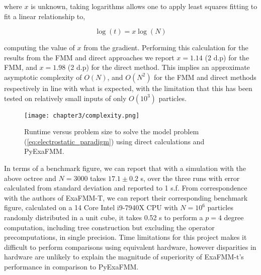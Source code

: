 where $x$ is unknown, taking logarithms allows one to apply least squares fitting
to fit a linear relationship to,

\begin{equation}
    \log(t) = x \log(N)
\end{equation}

computing the value of $x$ from the gradient. Performing this calculation for the
results from the \gls{FMM} and direct approaches we report $x=1.14$ (2 d.p) for
the FMM, and $x=1.98$ (2 d.p) for the direct method. This implies an approximate
asymptotic complexity of $O(N)$, and $O(N^2)$ for the \gls{FMM} and direct methods
respectively in line with what is expected, with the limitation that this has
been tested on relatively small inputs of only $O(10^3)$ particles.

\begin{figure}[ht]
    \centering

  {\texttt{[image: chapter3/complexity.png]}}
  \vspace{0pt}
    \caption{
        Runtime versus problem size to solve the model problem
        (\ref{eq:electrostatic_paradigm}) using direct calculations and
        \gls{PyExaFMM}.
    }
    \label{fig:3_1_complexity}
\end{figure}

In terms of a benchmark figure, we can report that with a simulation with
the above octree and $N=3000$ takes $17.1 \pm 0.2$ s, over the three runs with
error calculated from standard deviation and reported to 1 s.f. From correspondence
with the authors of ExaFMM-T, we can report their corresponding benchmark figure,
calculated on a 14 Core Intel i9-7940X \gls{CPU} with $N=10^6$ particles
randomly distributed in a unit cube, it takes 0.52 s to perform a $p=4$ degree
computation, including tree construction but excluding the
operator precomputations, in single precision. Time limitations for this project
makes it difficult to perform comparisons using equivalent hardware, however
disparities in hardware are unlikely to explain the magnitude of superiority
of ExaFMM-t's performance in comparison to \gls{PyExaFMM}.


